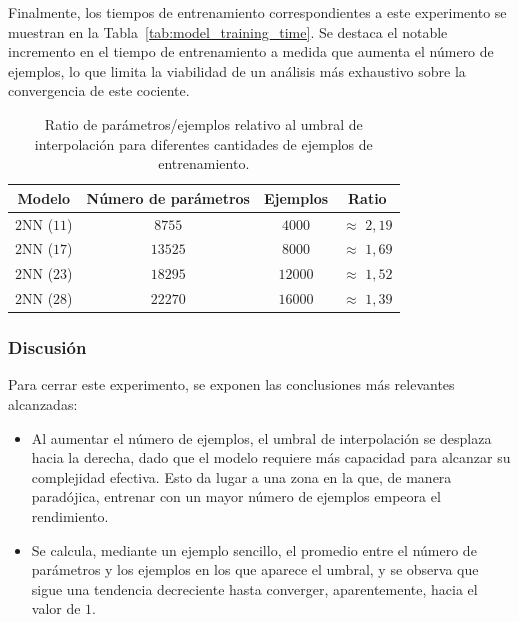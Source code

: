 Finalmente, los tiempos de entrenamiento correspondientes a este experimento se muestran en la Tabla~\ref{tab:model_training_time}. Se destaca el notable incremento en el tiempo de entrenamiento a medida que aumenta el número de ejemplos, lo que limita la viabilidad de un análisis más exhaustivo sobre la convergencia de este cociente.

\begin{table}[h]
    \centering
    \begin{tabular}{|c|c|c|c|}
    \hline
    \textbf{Modelo}       & \textbf{Número de parámetros} & \textbf{Ejemplos} & \textbf{Ratio} \\ 
    \hline
    $2$NN ($11$)          & $8755$   & $4000$  &  $\approx$ $2,19$  \\ 
    $2$NN ($17$)          & $13525$   & $8000$  &  $\approx$ $1,69$  \\ 
    $2$NN ($23$)          & $18295$   & $12000$  &  $\approx$ $1,52$  \\ 
    $2$NN ($28$)          & $22270$   & $16000$  &  $\approx$ $1,39$  \\ 
    \hline
    \end{tabular}
    \caption[Resumen del ratio parámetros/ejemplos.]{Ratio de parámetros/ejemplos relativo al umbral de interpolación para diferentes cantidades de ejemplos de entrenamiento.}\label{tab:ratioparamsexamples}
\end{table}

\subsubsection{Discusión}\label{subsubsec:discusion-numero-ejemplos}

Para cerrar este experimento, se exponen las conclusiones más relevantes alcanzadas:

\begin{itemize}
    \item Al aumentar el número de ejemplos, el umbral de interpolación se desplaza hacia la derecha, dado que el modelo requiere más capacidad para alcanzar su complejidad efectiva. Esto da lugar a una zona en la que, de manera paradójica, entrenar con un mayor número de ejemplos empeora el rendimiento.
    \item Se calcula, mediante un ejemplo sencillo, el promedio entre el número de parámetros y los ejemplos en los que aparece el umbral, y se observa que sigue una tendencia decreciente hasta converger, aparentemente, hacia el valor de $1$.
\end{itemize}

